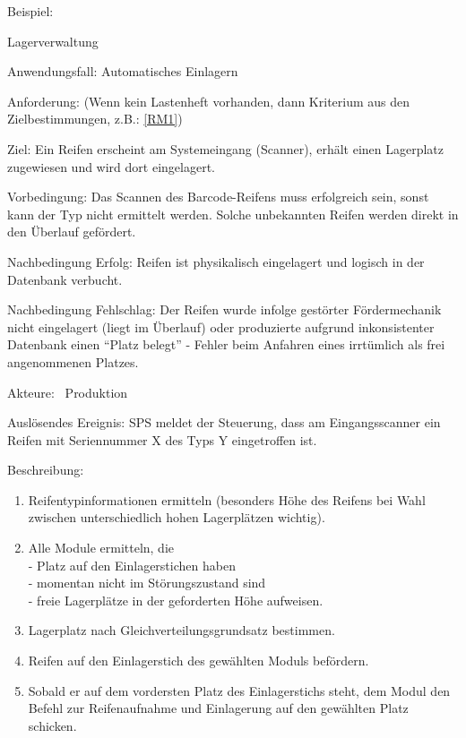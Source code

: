Beispiel:\\
\begin{function}{10}{Lagerverwaltung}
    \item[Anwendungsfall:] Automatisches Einlagern
    \item[Anforderung:]  (Wenn kein Lastenheft vorhanden, dann Kriterium aus den Zielbestimmungen, z.B.: \ref{RM1})
    \item[Ziel:] Ein Reifen erscheint am Systemeingang (Scanner), erhält einen Lagerplatz
    zugewiesen und wird dort eingelagert.
    \item[Vorbedingung:] Das Scannen des Barcode-Reifens muss erfolgreich sein, sonst kann
    der Typ nicht ermittelt werden. Solche unbekannten Reifen werden direkt in den
    Überlauf gefördert.
    \item[Nachbedingung Erfolg:] Reifen ist physikalisch eingelagert und logisch in der
    Datenbank verbucht.
    \item[Nachbedingung Fehlschlag:] Der Reifen wurde infolge gestörter Fördermechanik
    nicht eingelagert (liegt im Überlauf) oder produzierte aufgrund inkonsistenter
    Datenbank einen "`Platz belegt"' - Fehler beim Anfahren eines irrtümlich
    als frei angenommenen Platzes.
    \item[Akteure:] ~Produktion
    \item[Auslösendes Ereignis:] SPS meldet der Steuerung, dass am Eingangsscanner ein
    Reifen mit Seriennummer X des Typs Y eingetroffen ist.
    \item[Beschreibung:] ~
    \begin{enumerate}
      \item Reifentypinformationen ermitteln (besonders Höhe des Reifens bei Wahl zwischen unterschiedlich hohen Lagerplätzen wichtig).
      \item Alle Module ermitteln, die\\
    -  Platz auf den Einlagerstichen haben\\
    -  momentan nicht im Störungszustand sind\\
    -  freie Lagerplätze in der geforderten Höhe aufweisen.
      \item Lagerplatz nach Gleichverteilungsgrundsatz bestimmen.
      \item Reifen auf den Einlagerstich des gewählten Moduls befördern.
      \item Sobald er auf dem vordersten Platz des Einlagerstichs steht, dem Modul den Befehl zur Reifenaufnahme und Einlagerung auf den gewählten Platz schicken.

\end{enumerate}
\end{function}
